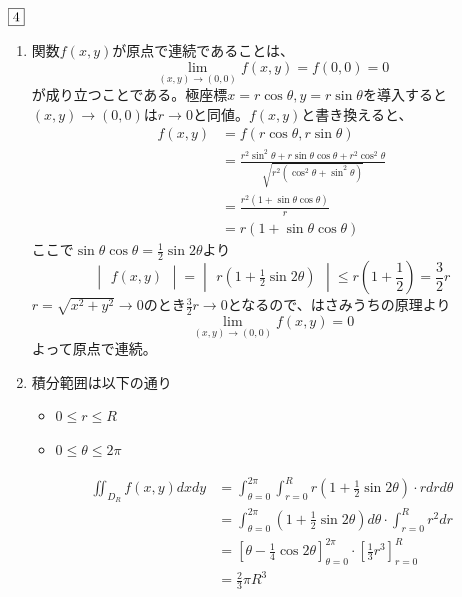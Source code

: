 \begin{souanswer} %
	$\fbox{4}$
\begin{enumerate}
	\item 関数$f(x, y)$が原点で連続であることは、
\begin{equation*}
	\lim_{(x, y)\to (0, 0)} f(x, y)= f(0, 0)= 0
\end{equation*}
	が成り立つことである。極座標$x= r\cos{\theta}, y= r\sin{\theta}$を導入すると$(x, y)\to (0, 0)$は$r\to 0$と同値。$f(x, y)$と書き換えると、
\begin{align*}
	f(x, y)
	&= f(r\cos{\theta}, r\sin{\theta})\\
	&= \frac{r^2\sin^2{\theta}+ r\sin{\theta}\cos{\theta}+ r^2\cos^2{\theta}}{\sqrt{r^2(\cos^2{\theta}+ \sin^2{\theta})}}\\
	&= \frac{r^2(1+ \sin{\theta}\cos{\theta})}{r}\\
	&= r(1+ \sin{\theta}\cos{\theta})
\end{align*}
	ここで$\sin{\theta}\cos{\theta}= \frac{1}{2}\sin{2\theta}$より
\begin{equation*}
	\begin{vmatrix}f(x, y)\end{vmatrix}= \begin{vmatrix}r\left(1+ \frac{1}{2}\sin{2\theta}\right)\end{vmatrix}\le r\left(1+ \frac{1}{2}\right)= \frac{3}{2}r
\end{equation*}
	$r= \sqrt{x^2+ y^2}\to 0$のとき$\frac{3}{2}r\to 0$となるので、はさみうちの原理より
\begin{equation*}
	\lim_{(x, y)\to (0, 0)} f(x, y)= 0
\end{equation*}
	よって原点で連続。

	\item 積分範囲は以下の通り
\begin{itemize}
	\item $0\le r\le R$
	\item $0\le \theta\le 2\pi$
\end{itemize}
\begin{align*}
	\iint_{D_R} f(x, y) dxdy
	&= \int_{\theta= 0}^{2\pi}\int_{r= 0}^R r\left(1+ \frac{1}{2}\sin{2\theta}\right)\cdot rdrd\theta\\
	&= \int_{\theta= 0}^{2\pi} \left(1+ \frac{1}{2}\sin{2\theta}\right)d\theta\cdot \int_{r= 0}^R r^2 dr\\
	&= \left[\theta- \frac{1}{4}\cos{2\theta}\right]_{\theta= 0}^{2\pi}\cdot \left[\frac{1}{3}r^3\right]_{r= 0}^ R\\
	&= \frac{2}{3}\pi R^3
\end{align*}
\end{enumerate}
\end{souanswer}